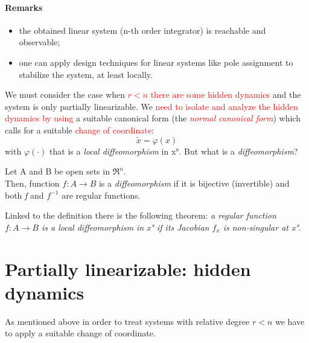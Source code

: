 \paragraph{Remarks} 
	\begin{itemize}
		\item the obtained linear system (n-th order integrator) is reachable and observable;
		\item one can apply design techniques for  linear systems like pole assignment to stabilize the system, at least locally.
	\end{itemize}
We must consider the case when \textcolor{red}{$r<n$ there are some hidden dynamics} and the system is only partially linearizable. We \textcolor{red}{need to isolate and analyze the hidden dynamics by using} a suitable canonical form (the \textcolor{red}{\emph{normal canonical form}}) which calls for a suitable \textcolor{red}{change of coordinate}: \[\tilde{x}=\varphi(x)\] with $\varphi(\cdot)$ that is a \emph{local diffeomorphism} in x°. But what is a \emph{diffeomorphism}?
\begin{defn}
	Let A and B be open sets in $\Re^n$.\\Then, function $f\colon A\to B$ is a \emph{diffeomorphism} if it is bijective (invertible) and  both \emph{f} and $f^{-1}$ are regular functions.
\end{defn}
Linked to the definition there is the following theorem: \emph{a regular function $f\colon A\to B$ is a local diffeomorphism in x° if its Jacobian $f_x$ is non-singular at x°}.
\section{Partially linearizable: hidden dynamics}
As mentioned above in order to treat systems with relative degree $r<n$ we have to apply a suitable change of coordinate.

